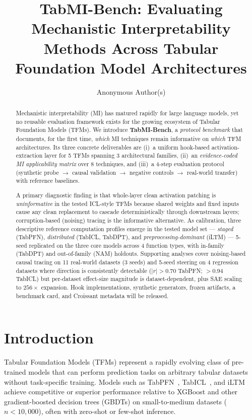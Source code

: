 \documentclass{article}
\title{TabMI-Bench: Evaluating Mechanistic Interpretability Methods Across Tabular Foundation Model Architectures}
\author{
  Anonymous Author(s)
}
\begin{document}
\maketitle

\begin{abstract}
Mechanistic interpretability (MI) has matured rapidly for large language models, yet no reusable evaluation framework exists for the growing ecosystem of Tabular Foundation Models (TFMs). We introduce \textbf{TabMI-Bench}, a \emph{protocol benchmark} that documents, for the first time, \emph{which} MI techniques remain informative on \emph{which} TFM architectures. Its three concrete deliverables are (i)~a uniform hook-based activation-extraction layer for 5 TFMs spanning 3 architectural families, (ii)~an \emph{evidence-coded MI applicability matrix} over 8 techniques, and (iii)~a 4-step evaluation protocol (synthetic probe $\to$ causal validation $\to$ negative controls $\to$ real-world transfer) with reference baselines.

A primary diagnostic finding is that whole-layer clean activation patching is \emph{uninformative} in the tested ICL-style TFMs because shared weights and fixed inputs cause any clean replacement to cascade deterministically through downstream layers; corruption-based (noising) tracing is the informative alternative. As calibration, three descriptive reference computation profiles emerge in the tested model set --- \textit{staged} (TabPFN), \textit{distributed} (TabICL, TabDPT), and \textit{preprocessing-dominant} (iLTM) --- 5-seed replicated on the three core models across 4 function types, with in-family (TabDPT) and out-of-family (NAM) holdouts. Supporting analyses cover noising-based causal tracing on 11 real-world datasets (3 seeds) and 5-seed steering on 4 regression datasets where direction is consistently detectable ($|r|{>}0.70$ TabPFN; $>0.94$ TabICL) but per-dataset effect-size magnitude is dataset-dependent, plus SAE scaling to $256\times$ expansion. Hook implementations, synthetic generators, frozen artifacts, a benchmark card, and Croissant metadata will be released.
\end{abstract}

\section{Introduction}

Tabular Foundation Models (TFMs) represent a rapidly evolving class of pre-trained models that can perform prediction tasks on arbitrary tabular datasets without task-specific training. Models such as TabPFN~\cite{hollmann2025tabpfn}, TabICL~\cite{qu2025tabicl}, and iLTM~\cite{ye2025iltm} achieve competitive or superior performance relative to XGBoost and other gradient-boosted decision trees (GBDTs) on small-to-medium datasets ($n < 10{,}000$), often with zero-shot or few-shot inference.
\end{document}
